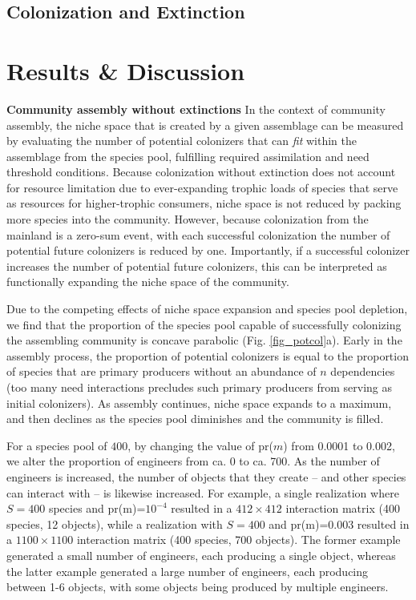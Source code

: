 \documentclass[twocolumn,preprintnumbers,amsmath,amssymb,superscriptaddress]{revtex4-1}
\begin{document}
\subsection{Colonization and Extinction}


\section*{Results \& Discussion}




{\bf Community assembly without extinctions}
In the context of community assembly, the niche space that is created by a given assemblage can be measured by evaluating the number of potential colonizers that can \emph{fit} within the assemblage from the species pool, fulfilling required assimilation and need threshold conditions.
Because colonization without extinction does not account for resource limitation due to ever-expanding trophic loads of species that serve as resources for higher-trophic consumers, niche space is not reduced by packing more species into the community.
However, because colonization from the mainland is a zero-sum event, with each successful colonization the number of potential future colonizers is reduced by one.
Importantly, if a successful colonizer increases the number of potential future colonizers, this can be interpreted as functionally expanding the niche space of the community.




Due to the competing effects of niche space expansion and species pool depletion, we find that the proportion of the species pool capable of successfully colonizing the assembling community is concave parabolic (Fig. \ref{fig_potcol}a).
Early in the assembly process, the proportion of potential colonizers is equal to the proportion of species that are primary producers without an abundance of $n$ dependencies (too many need interactions precludes such primary producers from serving as initial colonizers).
As assembly continues, niche space expands to a maximum, and then declines as the species pool diminishes and the community is filled.


For a species pool of $400$, by changing the value of pr($m$) from 0.0001 to 0.002, we alter the proportion of engineers from ca. 0 to ca. 700.
As the number of engineers is increased, the number of objects that they create -- and other species can interact with -- is likewise increased.
For example, a single realization where $S=400$ species and pr(m)=$10^{-4}$ resulted in a $412\times412$ interaction matrix (400 species, 12 objects), while a realization with $S=400$ and pr(m)=$0.003$ resulted in a $1100\times1100$ interaction matrix (400 species, 700 objects).
The former example generated a small number of engineers, each producing a single object, whereas the latter example generated a large number of engineers, each producing between 1-6 objects, with some objects being produced by multiple engineers.
\end{document}
